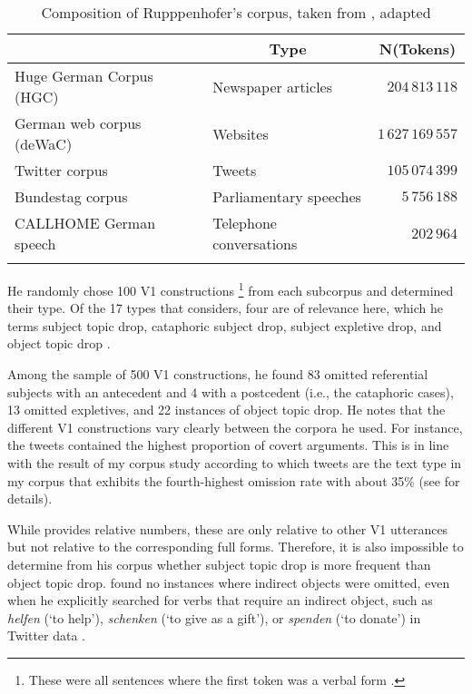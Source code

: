 \begin{table}
\caption{Composition of Rupppenhofer's corpus, taken from \citet[209]{ruppenhofer2018}, adapted}
\centering
\begin{tabular}{llr}
\lsptoprule
\multicolumn{1}{c}{Corpus name} & \multicolumn{1}{c}{Type} & \multicolumn{1}{c}{N(Tokens)} \\
\midrule
Huge German Corpus (HGC) & Newspaper articles &	$204\,813\,118 $	\\
German web corpus (deWaC) & Websites & 	$1\,627\,169\,557$ \\
Twitter corpus 	& Tweets &	$105\,074\,399$	\\
Bundestag corpus & Parliamentary speeches & $5\,756\,188$ \\
CALLHOME German speech 	& Telephone conversations &	$202\,964$ \\
\lspbottomrule
\end{tabular}
\label{tab:ruppenhofer.data}
\end{table}

\noindent
He randomly chose 100 V1 constructions%
\footnote{These were all sentences where the first token was a verbal form \citep[217]{ruppenhofer2018}.}
%
from each subcorpus and determined their type.
Of the 17 types that \citet{ruppenhofer2018} considers, four are of relevance here, which he terms subject topic drop, cataphoric subject drop, subject expletive  drop, and object topic drop \citep[218]{ruppenhofer2018}.

Among the sample of 500 V1 constructions, he found 83 omitted referential subjects with an antecedent  and 4 with a postcedent (i.e., the cataphoric cases), 13 omitted expletives,  and 22 instances of object topic drop.
He notes that the different V1 constructions vary clearly between the corpora he used.
For instance, the tweets contained the highest proportion of covert arguments.
This is in line with the result of my corpus study according to which tweets are the text type  in my corpus that exhibits the fourth-highest omission rate with about 35\% (see  for details).

While \citet{ruppenhofer2018} provides relative numbers, these are only relative to other V1 utterances but not relative to the corresponding full forms.
Therefore, it is also impossible to determine from his corpus whether subject topic drop is more frequent than object topic drop.
\citet{ruppenhofer2018} found no instances where indirect objects were omitted, even when he explicitly searched for verbs that require an indirect object, such as \textit{helfen} (`to help'), \textit{schenken} (`to give as a gift'), or \textit{spenden} (`to donate') in Twitter data \citep[224--225]{ruppenhofer2018}.

